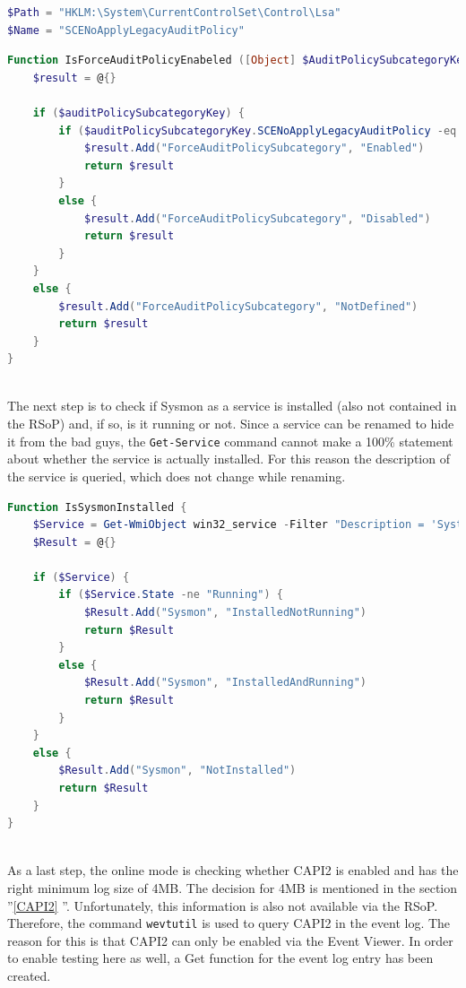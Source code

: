 \begin{lstlisting}[language=PowerShell]
$Path = "HKLM:\System\CurrentControlSet\Control\Lsa"
$Name = "SCENoApplyLegacyAuditPolicy"
\end{lstlisting}


\begin{lstlisting}[caption=Function IsForceAuditPolicyEnabeled, language=PowerShell]
Function IsForceAuditPolicyEnabeled ([Object] $AuditPolicySubcategoryKey) {
    $result = @{}

    if ($auditPolicySubcategoryKey) {
        if ($auditPolicySubcategoryKey.SCENoApplyLegacyAuditPolicy -eq 1) {
            $result.Add("ForceAuditPolicySubcategory", "Enabled")
            return $result
        }
        else {
            $result.Add("ForceAuditPolicySubcategory", "Disabled")
            return $result
        }
    }
    else {
        $result.Add("ForceAuditPolicySubcategory", "NotDefined")
        return $result
    }
}
\end{lstlisting}\ \\
The next step is to check if Sysmon as a service is installed (also not contained in the RSoP) and, if so, is it running or not. Since a service can be renamed to hide it from the bad guys, the \lstinline|Get-Service| command cannot make a 100\% statement about whether the service is actually installed. For this reason the description of the service is queried, which does not change while renaming. \cite{Sysmon1}
\begin{lstlisting}[caption=Function IsSysmonInstalled, language=PowerShell]
Function IsSysmonInstalled {
    $Service = Get-WmiObject win32_service -Filter "Description = 'System Monitor service'"
    $Result = @{}

    if ($Service) {
        if ($Service.State -ne "Running") {
            $Result.Add("Sysmon", "InstalledNotRunning")
            return $Result
        }
        else {
            $Result.Add("Sysmon", "InstalledAndRunning")
            return $Result
        }
    }
    else {
        $Result.Add("Sysmon", "NotInstalled")
        return $Result
    }
}
\end{lstlisting}

\clearpage \ \\
As a last step, the online mode is checking whether CAPI2 is enabled and has the right minimum log size of 4MB. The decision for 4MB is mentioned in the section ''\ref{CAPI2} ''. Unfortunately, this information is also not available via the RSoP. Therefore, the command \lstinline|wevtutil| is used to query CAPI2 in the event log. The reason for this is that CAPI2 can only be enabled via the Event Viewer. \cite{CAPI2} In order to enable testing here as well, a Get function for the event log entry has been created.

